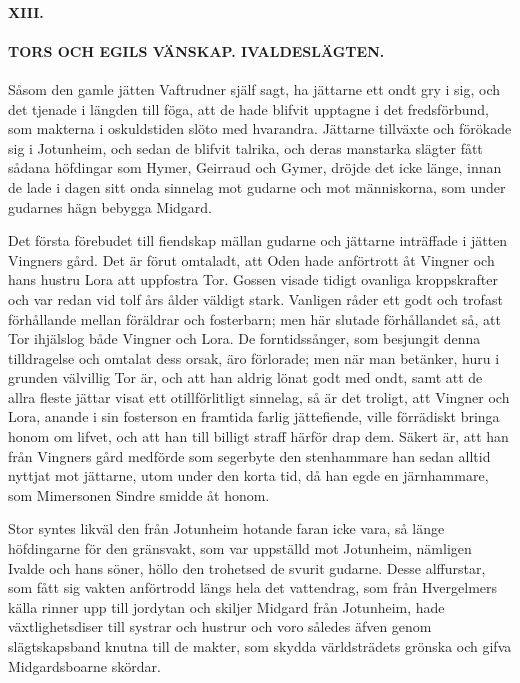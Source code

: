 \protect\hypertarget{lb1625905.xhtmlux5cux23start36}{}{}\protect\hypertarget{lb1625905.xhtmlux5cux23start36-a}{}{}\protect\hypertarget{lb1625905.xhtmlux5cux23start36-b}{}{}\protect\hypertarget{lb1625905.xhtmlux5cux23start36-c}{}{}\protect\hypertarget{lb1625905.xhtmlux5cux23start36-d}{}{}

\paragraph{XIII.}

\paragraph{TORS OCH EGILS VÄNSKAP. IVALDESLÄGTEN.}

Såsom den gamle jätten Vaftrudner själf sagt, ha jättarne ett ondt gry i
sig, och det tjenade i längden till föga, att de hade blifvit upptagne i
det fredsförbund, som makterna i oskuldstiden slöto med hvarandra.
Jättarne tillväxte och förökade sig i Jotunheim, och sedan de blifvit
talrika, och deras manstarka slägter fått sådana höfdingar som Hymer,
Geirraud och Gymer, dröjde det icke länge, innan de lade i dagen sitt
onda sinnelag mot gudarne och mot människorna, som under gudarnes hägn
bebygga Midgard.

Det första förebudet till fiendskap mällan gudarne och jättarne
inträffade i jätten Vingners gård. Det är förut omtaladt, att Oden hade
anförtrott åt Vingner och hans hustru Lora att uppfostra Tor. Gossen
visade tidigt ovanliga kroppskrafter och var redan vid tolf års ålder
väldigt stark. Vanligen råder ett godt och trofast förhållande mellan
föräldrar och fosterbarn; men här slutade förhållandet så, att Tor
ihjälslog både Vingner och Lora. De forntidssånger, som besjungit denna
tilldragelse och omtalat dess orsak, äro förlorade; men när man
betänker, huru i grunden välvillig Tor är, och att han aldrig lönat godt
med ondt, samt att de allra fleste jättar visat ett otillförlitligt
sinnelag, så är det troligt, att Vingner och Lora, anande i sin
fosterson en framtida farlig jättefiende, ville förrädiskt bringa honom
om lifvet, och att han till billigt straff härför drap dem. Säkert är,
att han från Vingners gård medförde som segerbyte den stenhammare han
sedan alltid nyttjat mot jättarne, utom under den korta tid, då han egde
en järnhammare, som Mimersonen Sindre smidde åt honom.

Stor syntes likväl den från Jotunheim hotande faran icke vara, så länge
höfdingarne för den gränsvakt, som var uppställd mot Jotunheim, nämligen
Ivalde och hans söner, höllo den trohetsed de svurit gudarne. Desse
alffurstar, som fått sig vakten anförtrodd längs hela det vattendrag,
som från
\protect\hypertarget{lb1625905.xhtmlux5cux23start37}{}{}\protect\hypertarget{lb1625905.xhtmlux5cux23start37-a}{}{}\protect\hypertarget{lb1625905.xhtmlux5cux23start37-b}{}{}\protect\hypertarget{lb1625905.xhtmlux5cux23start37-c}{}{}\protect\hypertarget{lb1625905.xhtmlux5cux23start37-d}{}{}
Hvergelmers källa rinner upp till jordytan och skiljer Midgard från
Jotunheim, hade växtlighetsdiser till systrar och hustrur och voro
således äfven genom slägtskapsband knutna till de makter, som skydda
världsträdets grönska och gifva Midgardsboarne skördar.

